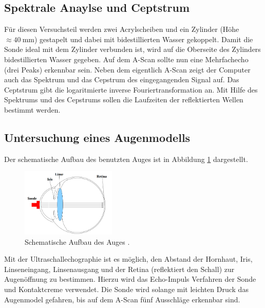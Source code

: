 \subsection{Spektrale Anaylse und Ceptstrum}

Für diesen Versuchsteil werden zwei Acrylscheiben und ein Zylinder (Höhe $\approx \SI{40}{\milli\meter}$)
gestapelt und dabei mit bidestillierten Wasser gekoppelt.
Damit die Sonde ideal mit dem Zylinder verbunden ist, wird auf die Oberseite des Zylinders
bidestillierten Wasser gegeben.
Auf dem A-Scan sollte nun eine Mehrfachecho (drei Peaks) erkennbar sein.
Neben dem eigentlich A-Scan zeigt der Computer auch das Spektrum und das Cepstrum des
eingegangenden Signal auf.
Das Ceptstrum gibt die logaritmierte inverse Fouriertransformation an.
Mit Hilfe des Spektrums und des Cepstrums sollen die Laufzeiten der reflektierten Wellen
bestimmt werden.

\subsection{Untersuchung eines Augenmodells}

Der schematische Aufbau des benutzten Auges ist in Abbildung \ref{fig: auge} dargestellt.
\begin{figure}[h]
  \centering
  \includegraphics[width=0.4\textwidth]{pics/auge.png}
  \caption{Schematische Aufbau des Auges \cite{anleitungus1}.}
  \label{fig: auge}
\end{figure}
Mit der Ultraschallechographie ist es möglich, den Abstand der Hornhaut, Iris, Linseneingang, Linsenausgang
und der Retina (reflektiert den Schall) zur Augenöffnung zu bestimmen.
Hierzu wird das Echo-Impuls Verfahren der Sonde und Kontaktcreme verwendet.
Die Sonde wird solange mit leichten Druck das Augenmodel gefahren, bis auf dem
A-Scan fünf Ausschläge erkennbar sind.
